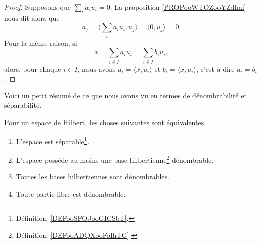 \begin{proof}
	Supposons que \( \sum_ia_iu_i=0\). La proposition \ref{PROPooWTOZooYZdlml} nous dit alors que
	\begin{equation}
		a_j=\langle \sum_ia_iu_i, u_j\rangle =\langle 0, u_j\rangle =0.
	\end{equation}
	Pour la même raison, si
	\begin{equation}
		x=\sum_{i\in I}a_iu_i=\sum_{i\in I}b_iu_i,
	\end{equation}
	alors, pour chaque \( i\in I\), nous avons \( a_i=\langle x, u_i\rangle \) et \( b_i=\langle x, u_i\rangle \), c'est à dire \( a_i=b_i\).
\end{proof}

Voici un petit résumé de ce que nous avons vu en termes de dénombrabilité et séparabilité.
\begin{theorem}     \label{THOooMKNFooVrCNGA}
	Pour un espace de Hilbert, les choses suivantes sont équivalentes.
	\begin{enumerate}
		\item       \label{ITEMooSJKVooFIIbwg}
		      L'espace est séparable\footnote{Définition~\ref{DEFooSFOJooGICSbT}.}.
		\item       \label{ITEMooQIZLooYdtYqF}
		      L'espace possède au moins une base hilbertienne\footnote{Définition~\ref{DEFooADQXooFoIhTG}.} dénombrable.
		\item       \label{ITEMooHYSXooOubwUy}
		      Toutes les bases hilbertiennes sont dénombrables.
		\item       \label{ITEMooMZICooNBAVum}
		      Toute partie libre est dénombrable.
	\end{enumerate}
\end{theorem}

